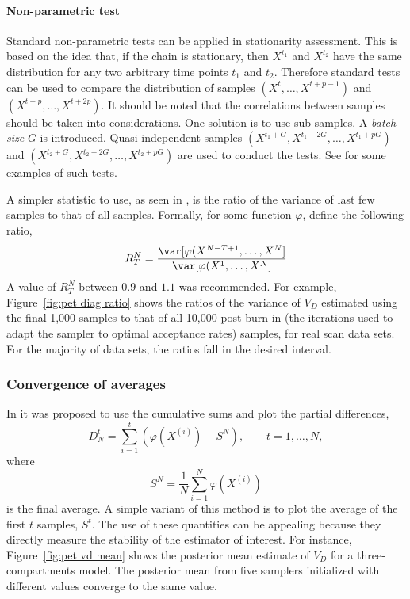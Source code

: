 


\paragraph{Non-parametric test}

Standard non-parametric tests can be applied in stationarity assessment. This
is based on the idea that, if the chain is stationary, then $X^{t_1}$ and
$X^{t_2}$ have the same distribution for any two arbitrary time points $t_1$
and $t_2$. Therefore standard tests can be used to compare the distribution of
samples $(X^t,\dots,X^{t+p-1})$ and $(X^{t+p},\dots,X^{t+2p})$. It should be
noted that the correlations between samples should be taken into
considerations. One solution is to use sub-samples. A \emph{batch size} $G$ is
introduced. Quasi-independent samples
$(X^{t_1+G},X^{t_1+2G},\dots,X^{t_1+pG})$ and
$(X^{t_2+G},X^{t_2+2G},\dots,X^{t_2+pG})$ are used to conduct the tests. See
\cite[][sec.~12.2.2]{Robert:2004tn} for some examples of such tests.

A simpler statistic to use, as seen in \cite{Gelman:2011vx}, is the ratio of
the variance of last few samples to that of all samples. Formally, for some
function $\varphi$, define the following ratio,
\begin{equation}
  R_T^N = \frac{\var[\varphi(X^{N-T+1},\dots,X^{N}]}
  {\var[\varphi(X^{1},\dots,X^{N}]}
\end{equation}
A value of $R_T^N$ between $0.9$ and $1.1$ was recommended. For example,
Figure~\ref{fig:pet diag ratio} shows the ratios of the variance of $V_D$
estimated using the final 1,000 samples to that of all 10,000 post burn-in
(the iterations used to adapt the sampler to optimal acceptance rates)
samples, for real \pet scan data sets. For the majority of data sets, the
ratios fall in the desired interval.



\subsubsection{Convergence of averages}
\label{ssub:Convergence of averages}

In \cite{Yu:1998fn} it was proposed to use the cumulative sums and plot the
partial differences,
\begin{equation}
  D_N^t = \sum_{i=1}^t (\varphi(X^{(i)}) - S^N), \qquad t = 1,\dots,N,
\end{equation}
where
\begin{equation}
  S^N = \frac{1}{N}\sum_{i=1}^N \varphi(X^{(i)})
\end{equation}
is the final average. A simple variant of this method is to plot the average
of the first $t$ samples, $S^t$. The use of these quantities can be appealing
because they directly measure the stability of the estimator of interest. For
instance, Figure~\ref{fig:pet vd mean} shows the posterior mean estimate of
$V_D$ for a three-compartments \pet model. The posterior mean from five
samplers initialized with different values converge to the same value.

